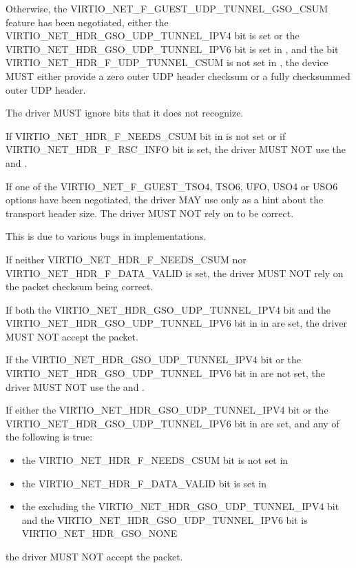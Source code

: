 Otherwise, the VIRTIO_NET_F_GUEST_UDP_TUNNEL_GSO_CSUM feature has been
negotiated, either the VIRTIO_NET_HDR_GSO_UDP_TUNNEL_IPV4 bit is set or the
VIRTIO_NET_HDR_GSO_UDP_TUNNEL_IPV6 bit is set in ,
and the bit VIRTIO_NET_HDR_F_UDP_TUNNEL_CSUM is not set in
, the device MUST either provide a zero outer UDP header
checksum or a fully checksummed outer UDP header.


The driver MUST ignore  bits that it does not recognize.

If VIRTIO_NET_HDR_F_NEEDS_CSUM bit in  is not set or
if VIRTIO_NET_HDR_F_RSC_INFO bit  is set, the
driver MUST NOT use the  and .

If one of the VIRTIO_NET_F_GUEST_TSO4, TSO6, UFO, USO4 or USO6 options have
been negotiated, the driver MAY use  only as a hint about the
transport header size.
The driver MUST NOT rely on  to be correct.
\begin{note}
This is due to various bugs in implementations.
\end{note}

If neither VIRTIO_NET_HDR_F_NEEDS_CSUM nor
VIRTIO_NET_HDR_F_DATA_VALID is set, the driver MUST NOT
rely on the packet checksum being correct.

If both the VIRTIO_NET_HDR_GSO_UDP_TUNNEL_IPV4 bit and
the VIRTIO_NET_HDR_GSO_UDP_TUNNEL_IPV6 bit in in  are set,
the driver MUST NOT accept the packet.

If the VIRTIO_NET_HDR_GSO_UDP_TUNNEL_IPV4 bit or the VIRTIO_NET_HDR_GSO_UDP_TUNNEL_IPV6
bit in  are not set, the driver MUST NOT use the
 and .

If either the VIRTIO_NET_HDR_GSO_UDP_TUNNEL_IPV4 bit or
the VIRTIO_NET_HDR_GSO_UDP_TUNNEL_IPV6 bit in  are set, and any of
the following is true:
\begin{itemize}
\item the VIRTIO_NET_HDR_F_NEEDS_CSUM bit is not set in 
\item the VIRTIO_NET_HDR_F_DATA_VALID bit is set in 
\item the  excluding the VIRTIO_NET_HDR_GSO_UDP_TUNNEL_IPV4
bit and the VIRTIO_NET_HDR_GSO_UDP_TUNNEL_IPV6 bit is VIRTIO_NET_HDR_GSO_NONE
\end{itemize}
the driver MUST NOT accept the packet.

